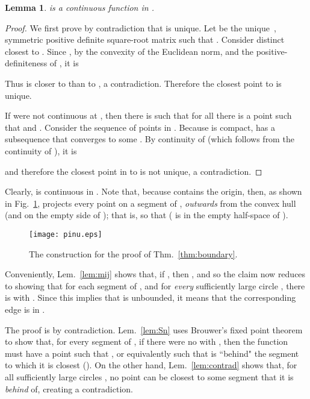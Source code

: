 \documentclass[11pt]{article}
\newtheorem{lemma}[theorem]{Lemma}
\begin{document}
\begin{lemma}\label{lem:piC0}
 is a continuous function in . 
\end{lemma}
\begin{proof}
We first prove by contradiction that  is unique. 
Let  be the unique~\cite{avd}, symmetric positive definite square-root matrix such that . 
Consider distinct
 closest to . 
Since , by the convexity of the Euclidean norm, and the positive-definiteness of , it is

Thus  is closer to  than to
, a contradiction. Therefore the closest point  to  is
unique. 

If  were not continuous at , then there is  such that 
for all  there is a point  such that 
and . 
Consider the sequence  of points in
. Because  is compact,  has a
subsequence that converges to some . 
By continuity of  (which follows from the continuity of ), it is

and therefore the closest point in  to  is not unique, a
contradiction. 
\end{proof}




Clearly,  is continuous in . 
Note that, because  contains the origin, then, as shown in Fig.~\ref{fig:pinu},  projects 
every point  on a segment of , 
\emph{outwards} from the convex hull (and on the empty side of
); that is, so that 
( is in the empty half-space of ). 



\begin{figure}[htbp]
   \centering
   	\texttt{[image: pinu.eps]} \caption{The construction for the proof of Thm.~\ref{thm:boundary}.}
\label{fig:pinu}
\end{figure}



Conveniently, Lem.~\ref{lem:mij} shows that, if , then
, and so the claim now reduces to showing that for each
segment  of , and for \emph{every} sufficiently large circle , 
there is  with . Since this implies that  is
unbounded, it means that the corresponding edge  is in . 

The proof is by contradiction. 
Lem.~\ref{lem:Sn} uses Brouwer's fixed point theorem to show that, for every segment  of , 
if there were no  with , then 
the function  must have a point  such that
, or equivalently such that 
 is ``behind" the segment  to which it is
closest (). 
On the other hand, Lem.~\ref{lem:contrad} shows that, for all sufficiently large circles , no
point  can be closest to some segment
 that it is \emph{behind} of, creating a contradiction. 
\end{document}
